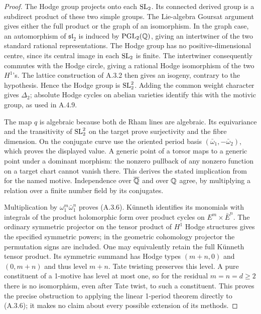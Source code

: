 \begin{proof}
The Hodge group projects onto each $\operatorname{SL}_2$. Its connected derived group is a subdirect product of these two simple groups. The Lie-algebra Goursat argument gives either the full product or the graph of an isomorphism. In the graph case, an automorphism of $\mathfrak{sl}_2$ is induced by $\mathrm{PGL}_2(\mathbb Q)$, giving an intertwiner of the two standard rational representations. The Hodge group has no positive-dimensional centre, since its central image in each $\operatorname{SL}_2$ is finite. The intertwiner consequently commutes with the Hodge circle, giving a rational Hodge isomorphism of the two $H^1$'s. The lattice construction of A.3.2 then gives an isogeny, contrary to the hypothesis. Hence the Hodge group is $\operatorname{SL}_2^2$. Adding the common weight character gives $\Delta_2$; absolute Hodge cycles on abelian varieties identify this with the motivic group, as used in A.4.9.

The map $q$ is algebraic because both de Rham lines are algebraic. Its equivariance and the transitivity of $\operatorname{SL}_2^2$ on the target prove surjectivity and the fibre dimension. On the conjugate curve use the oriented period basis $(\bar\omega_1,-\bar\omega_2)$, which proves the displayed value. A generic point of a torsor maps to a generic point under a dominant morphism: the nonzero pullback of any nonzero function on a target chart cannot vanish there. This derives the stated implication from \cite[Conjecture 2.12]{GenBostCharles} for the named motive. Independence over $\overline{\mathbb Q}$ and over $\mathbb Q$ agree, by multiplying a relation over a finite number field by its conjugates.

Multiplication by $\omega_1^m\bar\omega_1^n$ proves (A.3.6). K\"unneth identifies its monomials with integrals of the product holomorphic form over product cycles on $E^m\times\bar E^n$. The ordinary symmetric projector on the tensor product of $H^1$ Hodge structures gives the specified symmetric powers; in the geometric cohomology projector the permutation signs are included. One may equivalently retain the full K\"unneth tensor product. Its symmetric summand has Hodge types $(m+n,0)$ and $(0,m+n)$ and thus level $m+n$. Tate twisting preserves this level. A pure constituent of a 1-motive has level at most one, so for the residual $m=n=d\ge2$ there is no isomorphism, even after Tate twist, to such a constituent. This proves the precise obstruction to applying the linear 1-period theorem directly to (A.3.6); it makes no claim about every possible extension of its methods.
\end{proof}

